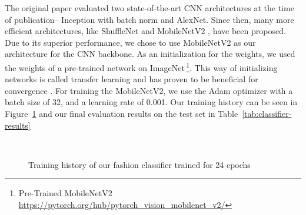 The original paper evaluated two state-of-the-art \ac{CNN} architectures at the time of publication-- Inception with batch norm and AlexNet. Since then, many more efficient architectures, like ShuffleNet \parencite{ma2018shufflenet} and MobileNetV2 \parencite{sandler2018mobilenetv2}, have been proposed. Due to its superior performance, we chose to use MobileNetV2 as our architecture for the \ac{CNN} backbone. As an initialization for the weights, we used the weights of a pre-trained network on ImageNet\,\footnote{Pre-Trained MobileNetV2 \url{https://pytorch.org/hub/pytorch_vision_mobilenet_v2/}}. This way of initializing networks is called transfer learning and has proven to be beneficial for convergence \parencite{shin2016deep}. For training the MobileNetV2, we use the Adam \parencite{Kingma:2014} optimizer with a batch size of 32, and a learning rate of 0.001. Our training history can be seen in Figure~\ref{fig:classifier-tensorboard} and our final evaluation results on the test set in Table~\ref{tab:classifier-results}

\begin{figure}[H]
	\centering
	\hspace{0.5cm}
	\\
	\hspace{0.5cm}
	\caption{Training history of our fashion classifier trained for 24 epochs}
	\label{fig:classifier-tensorboard}
\end{figure}
\pagebreak


